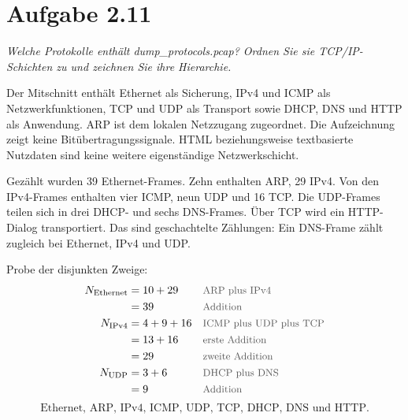\documentclass[a4paper,11pt]{article}
\newif\ifexplain
\newcommand{\aufgabe}[1]{\section*{Aufgabe #1}}
\newcommand{\angabe}[1]{{\raggedright\textit{#1}\par}\smallskip}
\newcommand{\why}[1]{\text{\small\color{black!65}#1}}
\newcommand{\explain}[1]{\ifexplain\begin{erklbox}#1\end{erklbox}\fi}
\begin{document}
\aufgabe{2.11}
\angabe{Welche Protokolle enthält dump\_protocols.pcap? Ordnen Sie sie TCP/IP-Schichten zu und zeichnen Sie ihre Hierarchie.}
Der Mitschnitt enthält Ethernet als Sicherung, IPv4 und ICMP als Netzwerkfunktionen, TCP und UDP als Transport sowie DHCP, DNS und HTTP als Anwendung. ARP ist dem lokalen Netzzugang zugeordnet. Die Aufzeichnung zeigt keine Bitübertragungssignale. HTML beziehungsweise textbasierte Nutzdaten sind keine weitere eigenständige Netzwerkschicht.

Gezählt wurden 39 Ethernet-Frames. Zehn enthalten ARP, 29 IPv4. Von den IPv4-Frames enthalten vier ICMP, neun UDP und 16 TCP. Die UDP-Frames teilen sich in drei DHCP- und sechs DNS-Frames. Über TCP wird ein HTTP-Dialog transportiert. Das sind geschachtelte Zählungen: Ein DNS-Frame zählt zugleich bei Ethernet, IPv4 und UDP.
\begin{center}
\end{center}
\explain{Die Grafik zeigt die Kapselung, nicht sieben zusätzliche Schichten. ICMP steht direkt unter IP, gehört funktional aber zur Netzwerkschicht. ARP läuft direkt über Ethernet und nicht über IP. Die Zahl 16 bei TCP bedeutet nicht 16 HTTP-Nachrichten: Aufbau, Bestätigungen und Abbau zählen ebenfalls als TCP-Frames.}
Probe der disjunkten Zweige:
\begin{align*}
N_{\mathrm{Ethernet}}&=10+29 &&\why{ARP plus IPv4}\\
&=39 &&\why{Addition}\\
N_{\mathrm{IPv4}}&=4+9+16 &&\why{ICMP plus UDP plus TCP}\\
&=13+16 &&\why{erste Addition}\\
&=29 &&\why{zweite Addition}\\
N_{\mathrm{UDP}}&=3+6 &&\why{DHCP plus DNS}\\
&=9 &&\why{Addition}
\end{align*}
\[\boxed{\text{Ethernet, ARP, IPv4, ICMP, UDP, TCP, DHCP, DNS und HTTP.}}\]
\end{document}
